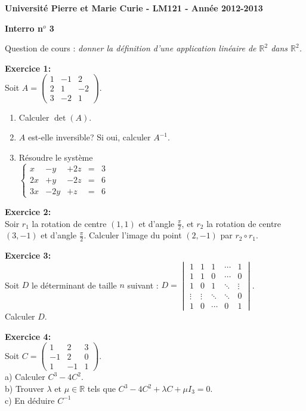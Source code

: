 \documentclass[a4paper, 10pt]{article}
\theoremstyle{plain}
\newcommand{\R}{\mathbb{R}}
\begin{document}
\noindent
\large
\textbf{Universit\'e Pierre et Marie Curie 
 - LM121 -
Ann\'ee 2012-2013}\\

\begin{center}
\Large
\textbf{Interro n$^o$ 3}
\end{center}
\normalsize

\medskip
\noindent
Question de cours : \emph{donner la définition d'une application linéaire de $\R^2$ dans $\R^2$.}

\medskip
\noindent
\textbf{Exercice 1:}\\
Soit $A = \begin{pmatrix} 1 & -1&2\\2&1&-2\\3&-2&1 \end{pmatrix}$.
\begin{enumerate}
 \item Calculer $\det (A)$.
\item $A$ est-elle inversible? Si oui, calculer $A^{-1}$.
\item Résoudre le système\\
$\left\{
\begin{array}{cccll}
 x&-y&+2z&=&3\\
2x&+y&-2z&=&6\\
3x&-2y&+z&=&6
\end{array}
\right.
$
\end{enumerate}

\bigskip
\noindent
\textbf{Exercice 2:}\\
Soir $r_1$ la rotation de centre 
$(1,1)$ et d'angle $\frac{\pi}{2}$, et 
$r_2$ la rotation de centre $(3,-1)$ et d'angle $\frac{\pi}{2}$.
Calculer l'image du point $(2,-1)$ par $r_2 \circ r_1$.

\bigskip
\noindent
\textbf{Exercice 3:}\\
Soit $D$ le déterminant de taille $n$ suivant : 
$D = 
\begin{vmatrix}
1 & 1 & 1 & \cdots & 1 \\
1 & 1 & 0 & \cdots & 0 \\
1 & 0 & 1 & \ddots & \vdots \\
\vdots & \vdots & \ddots & \ddots & 0 \\
1 & 0 & \cdots & 0 &1
\end{vmatrix}$.\\
Calculer $D$.

\bigskip
\noindent
\textbf{Exercice 4:}\\
Soit $C = 
\begin{pmatrix}
1 & 2 & 3 \\
-1 & 2 & 0 \\
1 & -1 & 1
\end{pmatrix}
$.\\
a) Calculer $C^3 -4C^2$. \\
b) Trouver $\lambda$ et $\mu \in \mathbb{R}$ tels que 
$C^3-4C^2 +\lambda C +\mu I_3=0$. \\
c) En déduire $C^{-1} $
\end{document}
